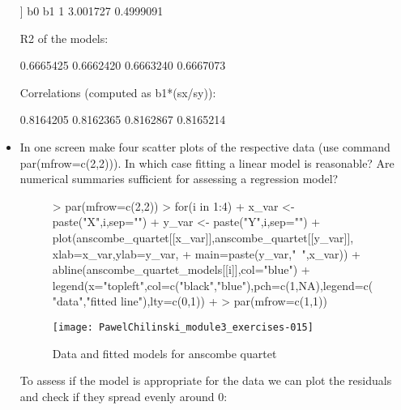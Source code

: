 \documentclass[a4paper]{article}
\begin{document}
\begin{itemize}
\begin{Schunk}
\begin{Soutput}
[[4]]
        b0        b1
1 3.001727 0.4999091
\end{Soutput}
\end{Schunk}
R2 of the models:
\begin{Schunk}
\begin{Soutput}
[1] 0.6665425 0.6662420 0.6663240 0.6667073
\end{Soutput}
\end{Schunk}
Correlations (computed as b1*(sx/sy)):
\begin{Schunk}
\begin{Soutput}
[1] 0.8164205 0.8162365 0.8162867 0.8165214
\end{Soutput}
\end{Schunk}
\item In one screen make four scatter plots of the respective data (use command par(mfrow=c(2,2))). In which case fitting a linear model is reasonable? Are numerical summaries sufficient for assessing a regression model?
\begin{figure}[H]
\begin{center}
\begin{Schunk}
\begin{Sinput}
> par(mfrow=c(2,2))
> for(i in 1:4){
+   x_var <- paste("X",i,sep="")
+   y_var <- paste("Y",i,sep="")
+   plot(anscombe_quartet[[x_var]],anscombe_quartet[[y_var]], xlab=x_var,ylab=y_var,
+        main=paste(y_var,"~",x_var))
+   abline(anscombe_quartet_models[[i]],col="blue")
+   legend(x="topleft",col=c("black","blue"),pch=c(1,NA),legend=c("data","fitted line"),lty=c(0,1))
+ }
> par(mfrow=c(1,1))
\end{Sinput}
\end{Schunk}
\texttt{[image: PawelChilinski\_module3\_exercises-015]}
\caption{Data and fitted models for anscombe quartet}
\end{center}
\end{figure}
To assess if the model is appropriate for the data we can plot the residuals and check if they spread evenly around 0:

\end{itemize}
\end{document}

